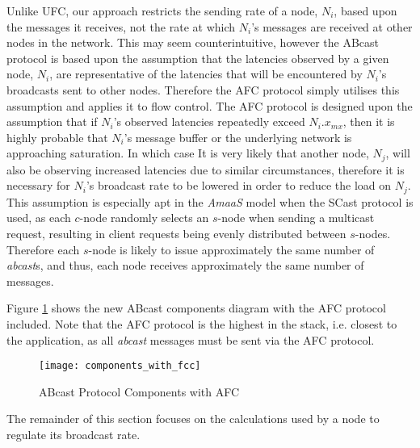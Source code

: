     Unlike \textsf{UFC}, our approach restricts the sending rate of a node, $N_i$, based upon the messages it receives, not the rate at which $N_i$'s messages are received at other nodes in the network.  This may seem counterintuitive, however the \textsf{ABcast} protocol is based upon the assumption that the latencies observed by a given node, $N_i$, are representative of the latencies that will be encountered by $N_i$'s broadcasts sent to other nodes.  Therefore the AFC protocol simply utilises this assumption and applies it to flow control.  The AFC protocol is designed upon the assumption that if $N_i$'s observed latencies repeatedly exceed $N_i.x_{mx}$, then it is highly probable that $N_i$'s message buffer or the underlying network is approaching saturation.  In which case It is very likely that another node, $N_j$, will also be observing increased latencies due to similar circumstances, therefore it is necessary for $N_i$'s broadcast rate to be lowered in order to reduce the load on $N_j$.  This assumption is especially apt in the \emph{AmaaS} model when the \textsf{SCast} protocol is used, as each $c$-node randomly selects an $s$-node when sending a multicast request, resulting in client requests being evenly distributed between $s$-nodes.  Therefore each $s$-node is likely to issue approximately the same number of \emph{abcast}s, and thus, each node receives approximately the same number of messages.          
    
    Figure \ref{fig:abcast_components_afc} shows the new \textsf{ABcast} components diagram with the AFC protocol included.  Note that the AFC protocol is the highest in the stack, i.e. closest to the application, as all \emph{abcast} messages must be sent via the AFC protocol.  
        
    \begin{figure}[!h] 
        \centering    
         \texttt{[image: components\_with\_fcc]}
         \caption[\textsf{ABcast} Protocol Components with AFC]{\textsf{ABcast} Protocol Components with AFC}
         \label{fig:abcast_components_afc}
    \end{figure}        
    
    The remainder of this section focuses on the calculations used by a node to regulate its broadcast rate.  
    

